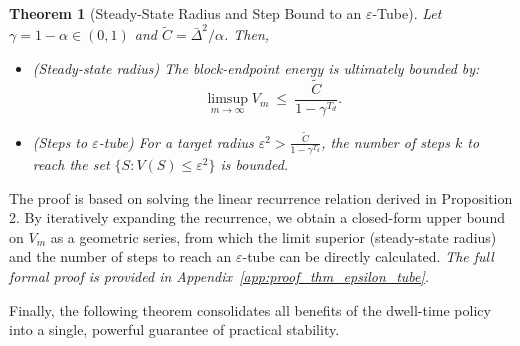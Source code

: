 \documentclass[journal]{IEEEtran}
\newtheorem{theorem}{Theorem}
\begin{document}
\begin{theorem}[Steady-State Radius and Step Bound to an $\varepsilon$-Tube]
\label{thm:epsilon_tube}
Let $\gamma=1-\alpha\in(0,1)$ and $\tilde C=\bar\Delta^2/\alpha$. Then,
\begin{itemize}
    \item[\textit{(a)}] (Steady-state radius) The block-endpoint energy is ultimately bounded by:
    \begin{equation}\label{eq:limsup_radius}
    \limsup_{m\to\infty}V_m\ \le\ \frac{\tilde C}{1-\gamma^{T_d}}.
    \end{equation}
    \item[\textit{(b)}] (Steps to $\varepsilon$-tube) For a target radius $\varepsilon^2 > \frac{\tilde C}{1-\gamma^{T_d}}$, the number of steps $k$ to reach the set $\{S: V(S)\le \varepsilon^2\}$ is bounded.
\end{itemize}
\end{theorem}
\begin{IEEEproof}
The proof is based on solving the linear recurrence relation derived in Proposition 2. By iteratively expanding the recurrence, we obtain a closed-form upper bound on $V_m$ as a geometric series, from which the limit superior (steady-state radius) and the number of steps to reach an $\varepsilon$-tube can be directly calculated. \textit{The full formal proof is provided in Appendix~\ref{app:proof_thm_epsilon_tube}.}
\end{IEEEproof}

Finally, the following theorem consolidates all benefits of the dwell-time policy into a single, powerful guarantee of practical stability.
\end{document}

